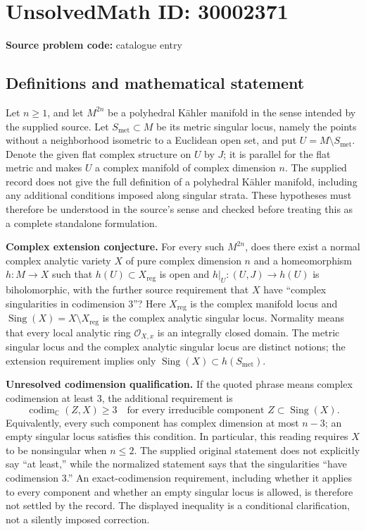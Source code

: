 \documentclass[11pt]{article}
\newcommand{\C}{\mathbb{C}}
\begin{document}
\section*{UnsolvedMath ID: 30002371}
\textbf{Source problem code:} catalogue entry
\subsection{Definitions and mathematical statement}
Let \(n\geq 1\), and let \(M^{2n}\) be a polyhedral Kähler manifold in the sense intended by the supplied source. Let \(S_{\mathrm{met}}\subset M\) be its metric singular locus, namely the points without a neighborhood isometric to a Euclidean open set, and put \(U=M\setminus S_{\mathrm{met}}\). Denote the given flat complex structure on \(U\) by \(J\); it is parallel for the flat metric and makes \(U\) a complex manifold of complex dimension \(n\). The supplied record does not give the full definition of a polyhedral Kähler manifold, including any additional conditions imposed along singular strata. These hypotheses must therefore be understood in the source's sense and checked before treating this as a complete standalone formulation.

\textbf{Complex extension conjecture.} For every such \(M^{2n}\), does there exist a normal complex analytic variety \(X\) of pure complex dimension \(n\) and a homeomorphism \(h:M\to X\) such that \(h(U)\subset X_{\mathrm{reg}}\) is open and \(h|_U:(U,J)\to h(U)\) is biholomorphic, with the further source requirement that \(X\) have ``complex singularities in codimension \(3\)''? Here \(X_{\mathrm{reg}}\) is the complex manifold locus and \(\operatorname{Sing}(X)=X\setminus X_{\mathrm{reg}}\) is the complex analytic singular locus. Normality means that every local analytic ring \(\mathcal O_{X,x}\) is an integrally closed domain. The metric singular locus and the complex analytic singular locus are distinct notions; the extension requirement implies only \(\operatorname{Sing}(X)\subset h(S_{\mathrm{met}})\).

\textbf{Unresolved codimension qualification.} If the quoted phrase means complex codimension at least \(3\), the additional requirement is
\[
\operatorname{codim}_{\C}(Z,X)\geq 3
\quad\text{for every irreducible component }Z\subset\operatorname{Sing}(X).
\]
Equivalently, every such component has complex dimension at most \(n-3\); an empty singular locus satisfies this condition. In particular, this reading requires \(X\) to be nonsingular when \(n\leq 2\). The supplied original statement does not explicitly say ``at least,'' while the normalized statement says that the singularities ``have codimension \(3\).'' An exact-codimension requirement, including whether it applies to every component and whether an empty singular locus is allowed, is therefore not settled by the record. The displayed inequality is a conditional clarification, not a silently imposed correction.
\end{document}
